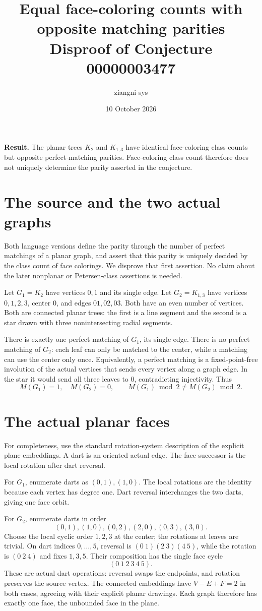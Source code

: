 \documentclass[11pt]{article}
\title{Equal face-coloring counts with opposite matching parities\\\large Disproof of Conjecture 00000003477}
\author{ziangni-sys}\date{10 October 2026}
\begin{document}
\maketitle
\noindent\textbf{Result.} The planar trees $K_2$ and $K_{1,3}$ have identical face-coloring class counts but opposite perfect-matching parities. Face-coloring class count therefore does not uniquely determine the parity asserted in the conjecture.

\section*{The source and the two actual graphs}
Both language versions define the parity through the number of perfect matchings of a planar graph, and assert that this parity is uniquely decided by the class count of face colorings. We disprove that first assertion. No claim about the later nonplanar or Petersen-class assertions is needed.

Let $G_1=K_2$ have vertices $0,1$ and its single edge. Let $G_2=K_{1,3}$ have vertices $0,1,2,3$, center $0$, and edges $01,02,03$. Both have an even number of vertices. Both are connected planar trees: the first is a line segment and the second is a star drawn with three nonintersecting radial segments.

There is exactly one perfect matching of $G_1$, its single edge. There is no perfect matching of $G_2$: each leaf can only be matched to the center, while a matching can use the center only once. Equivalently, a perfect matching is a fixed-point-free involution of the actual vertices that sends every vertex along a graph edge. In the star it would send all three leaves to $0$, contradicting injectivity. Thus
\[
 M(G_1)=1,\quad M(G_2)=0,\qquad
 M(G_1)\bmod2\ne M(G_2)\bmod2.
\]

\section*{The actual planar faces}
For completeness, use the standard rotation-system description of the explicit plane embeddings. A dart is an oriented actual edge. The face successor is the local rotation after dart reversal.

For $G_1$, enumerate darts as $(0,1),(1,0)$. The local rotations are the identity because each vertex has degree one. Dart reversal interchanges the two darts, giving one face orbit.

For $G_2$, enumerate darts in order
\[
 (0,1),(1,0),(0,2),(2,0),(0,3),(3,0).
\]
Choose the local cyclic order $1,2,3$ at the center; the rotations at leaves are trivial. On dart indices $0,\ldots,5$, reversal is
$(0\ 1)(2\ 3)(4\ 5)$, while the rotation is $(0\ 2\ 4)$ and fixes $1,3,5$. Their composition has the single face cycle
\[
 (0\ 1\ 2\ 3\ 4\ 5).
\]
These are actual dart operations: reversal swaps the endpoints, and rotation preserves the source vertex. The connected embeddings have $V-E+F=2$ in both cases, agreeing with their explicit planar drawings. Each graph therefore has exactly one face, the unbounded face in the plane.
\end{document}
